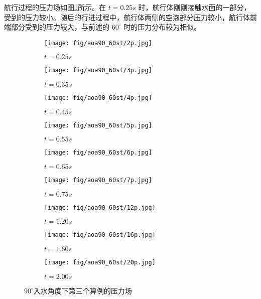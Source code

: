 航行过程的压力场如图\ref{fig:detail_90_p}所示。在 $t = 0.25s$ 时，航行体刚刚接触水面的一部分，受到的压力较小。随后的行进过程中，航行体两侧的空泡部分压力较小，航行体前端部分受到的压力较大，与前述的 $60^\circ$ 时的压力分布较为相似。

\begin{figure}[!htp]
  \centering

  \begin{subfigure}{0.25\textwidth}
    \centering
    \texttt{[image: fig/aoa90\_60st/2p.jpg]}
    \caption{$t = 0.25s$}
  \end{subfigure}
  \hspace{1cm}
  \begin{subfigure}{0.25\textwidth}
    \centering
    \texttt{[image: fig/aoa90\_60st/3p.jpg]}
    \caption{$t = 0.35s$}
  \end{subfigure}
  \hspace{1cm}
  \begin{subfigure}{0.25\textwidth}
    \centering
    \texttt{[image: fig/aoa90\_60st/4p.jpg]}
    \caption{$t = 0.45s$}
  \end{subfigure}

  \quad

  \begin{subfigure}{0.25\textwidth}
    \centering
    \texttt{[image: fig/aoa90\_60st/5p.jpg]}
    \caption{$t = 0.55s$}
  \end{subfigure}
  \hspace{1cm}
  \begin{subfigure}{0.25\textwidth}
    \centering
    \texttt{[image: fig/aoa90\_60st/6p.jpg]}
    \caption{$t = 0.65s$}
  \end{subfigure}
  \hspace{1cm}
  \begin{subfigure}{0.25\textwidth}
    \centering
    \texttt{[image: fig/aoa90\_60st/7p.jpg]}
    \caption{$t = 0.75s$}
  \end{subfigure}

  \quad

  \begin{subfigure}{0.25\textwidth}
    \centering
    \texttt{[image: fig/aoa90\_60st/12p.jpg]}
    \caption{$t = 1.20s$}
  \end{subfigure}
  \hspace{1cm}
  \begin{subfigure}{0.25\textwidth}
    \centering
    \texttt{[image: fig/aoa90\_60st/16p.jpg]}
    \caption{$t = 1.60s$}
  \end{subfigure}
  \hspace{1cm}
  \begin{subfigure}{0.25\textwidth}
    \centering
    \texttt{[image: fig/aoa90\_60st/20p.jpg]}
    \caption{$t = 2.00s$}
  \end{subfigure}

  \caption{$90^\circ$入水角度下第三个算例的压力场}
  \label{fig:detail_90_p}
\end{figure}

